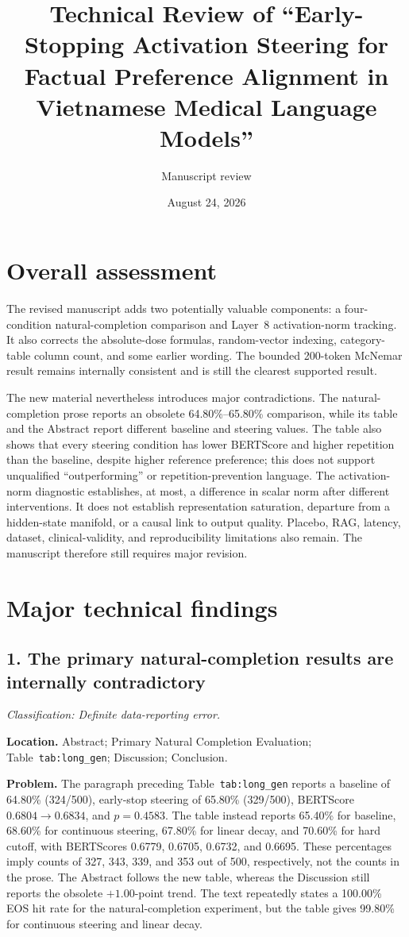 \documentclass[11pt]{article}
\title{Technical Review of ``Early-Stopping Activation Steering for Factual Preference Alignment in Vietnamese Medical Language Models''}
\author{Manuscript review}
\date{August 24, 2026}
\newcommand{\findinglabel}[1]{\textbf{#1}}
\newcommand{\classification}[1]{\textit{Classification: #1.}}
\begin{document}
\maketitle

\section*{Overall assessment}

The revised manuscript adds two potentially valuable components: a four-condition natural-completion comparison and Layer~8 activation-norm tracking.  It also corrects the absolute-dose formulas, random-vector indexing, category-table column count, and some earlier wording.  The bounded 200-token McNemar result remains internally consistent and is still the clearest supported result.

The new material nevertheless introduces major contradictions.  The natural-completion prose reports an obsolete 64.80\%--65.80\% comparison, while its table and the Abstract report different baseline and steering values.  The table also shows that every steering condition has lower BERTScore and higher repetition than the baseline, despite higher reference preference; this does not support unqualified ``outperforming'' or repetition-prevention language.  The activation-norm diagnostic establishes, at most, a difference in scalar norm after different interventions.  It does not establish representation saturation, departure from a hidden-state manifold, or a causal link to output quality.  Placebo, RAG, latency, dataset, clinical-validity, and reproducibility limitations also remain.  The manuscript therefore still requires major revision.

\section*{Major technical findings}

\subsection*{1. The primary natural-completion results are internally contradictory}

\classification{Definite data-reporting error}

\findinglabel{Location.} Abstract; Primary Natural Completion Evaluation; Table~\texttt{tab:long\_gen}; Discussion; Conclusion.

\findinglabel{Problem.} The paragraph preceding Table~\texttt{tab:long\_gen} reports a baseline of 64.80\% (324/500), early-stop steering of 65.80\% (329/500), BERTScore $0.6804\rightarrow0.6834$, and $p=0.4583$.  The table instead reports 65.40\% for baseline, 68.60\% for continuous steering, 67.80\% for linear decay, and 70.60\% for hard cutoff, with BERTScores 0.6779, 0.6705, 0.6732, and 0.6695.  These percentages imply counts of 327, 343, 339, and 353 out of 500, respectively, not the counts in the prose.  The Abstract follows the new table, whereas the Discussion still reports the obsolete $+1.00$-point trend.  The text repeatedly states a 100.00\% EOS hit rate for the natural-completion experiment, but the table gives 99.80\% for continuous steering and linear decay.
\end{document}

